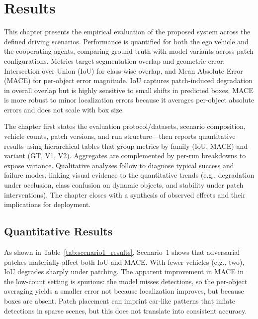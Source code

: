 \chapter{Results}
\label{results}

This chapter presents the empirical evaluation of the proposed system across the defined driving scenarios.
Performance is quantified for both the ego vehicle and the cooperating agents, comparing ground truth with model variants across patch configurations.
Metrics target segmentation overlap and geometric error: Intersection over Union (IoU) for class-wise overlap, and Mean Absolute Error (MACE) for per-object error magnitude.
IoU captures patch-induced degradation in overall overlap but is highly sensitive to small shifts in predicted boxes.
MACE is more robust to minor localization errors because it averages per-object absolute errors and does not scale with box size.

The chapter first states the evaluation protocol/datasets, scenario composition, vehicle counts, patch versions, and run structure—then reports quantitative results using hierarchical tables that group metrics by family (IoU, MACE) and variant (GT, V1, V2). 
Aggregates are complemented by per-run breakdowns to expose variance. Qualitative analyses follow to diagnose typical success and failure modes, linking visual evidence to the quantitative trends (e.g., degradation under occlusion, class confusion on dynamic objects, and stability under patch interventions). 
The chapter closes with a synthesis of observed effects and their implications for deployment.

\section{Quantitative Results}
\label{sec:quantitative_results}

As shown in Table~\ref{tab:scenario1_results}, Scenario~1 shows that adversarial patches materially affect both IoU and MACE.
With fewer vehicles (e.g., two), IoU degrades sharply under patching.
The apparent improvement in MACE in the low-count setting is spurious: the model misses detections, so the per-object averaging yields a smaller error not because localization improves, but because boxes are absent.
Patch placement can imprint car-like patterns that inflate detections in sparse scenes, but this does not translate into consistent accuracy.

